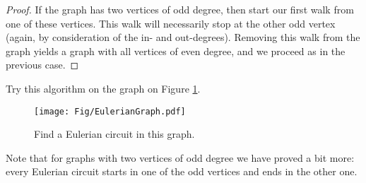 \begin{proof}
If the graph has two vertices of odd degree, then start our first walk from one of these vertices.
This walk will necessarily stop at the other odd vertex (again, by consideration of the in- and out-degrees).
Removing this walk from the graph yields a graph with all vertices of even degree, and we proceed as in the previous case.
\end{proof}

Try this algorithm on the graph on Figure \ref{fig:EulerianGraph}.

\begin{figure}[h]
\begin{center}
\texttt{[image: Fig/EulerianGraph.pdf]}
\end{center}
\caption{Find a Eulerian circuit in this graph.}
\label{fig:EulerianGraph}
\end{figure}

Note that for graphs with two vertices of odd degree we have proved a bit more:
every Eulerian circuit starts in one of the odd vertices and ends in the other one.












